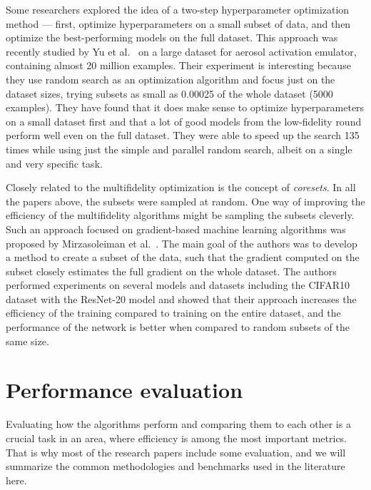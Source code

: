 
Some researchers explored the idea of a two-step hyperparameter optimization method --- first, optimize hyperparameters on a small subset of data, and then optimize the best-performing models on the full dataset. This approach was recently studied by Yu et al.~\cite{yu2024two} on a large dataset for aerosol activation emulator, containing almost 20 million examples. Their experiment is interesting because they use random search as an optimization algorithm and focus just on the dataset sizes, trying subsets as small as 0.00025 of the whole dataset (5000 examples). They have found that it does make sense to optimize hyperparameters on a small dataset first and that a lot of good models from the low-fidelity round perform well even on the full dataset. They were able to speed up the search 135 times while using just the simple and parallel random search, albeit on a single and very specific task.

Closely related to the multifidelity optimization is the concept of \textit{coresets}. In all the papers above, the subsets were sampled at random. One way of improving the efficiency of the multifidelity algorithms might be sampling the subsets cleverly. Such an approach focused on gradient-based machine learning algorithms was proposed by Mirzasoleiman et al.~\cite{mirzasoleiman2020coresets}. The main goal of the authors was to develop a method to create a subset of the data, such that the gradient computed on the subset closely estimates the full gradient on the whole dataset. The authors performed experiments on several models and datasets including the CIFAR10 dataset with the ResNet-20 model and showed that their approach increases the efficiency of the training compared to training on the entire dataset, and the performance of the network is better when compared to random subsets of the same size.

\section{Performance evaluation}
Evaluating how the algorithms perform and comparing them to each other is a crucial task in an area, where efficiency is among the most important metrics. That is why most of the research papers include some evaluation, and we will summarize the common methodologies and benchmarks used in the literature here.

